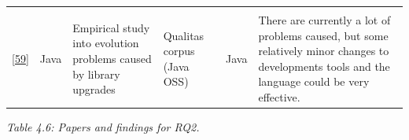 \documentclass[]{book}
\begin{document}
\begin{longtable}[]{@{}llllll@{}}
\begin{minipage}[t]{0.11\columnwidth}
\end{minipage}\tabularnewline
\begin{minipage}[t]{0.10\columnwidth}\raggedright\strut
{[}\protect\hyperlink{ref-Dietrich2014}{59}{]}\strut
\end{minipage} & \begin{minipage}[t]{0.18\columnwidth}\raggedright\strut
Java\strut
\end{minipage} & \begin{minipage}[t]{0.19\columnwidth}\raggedright\strut
Empirical study into evolution problems caused by library upgrades\strut
\end{minipage} & \begin{minipage}[t]{0.11\columnwidth}\raggedright\strut
Qualitas corpus (Java OSS)\strut
\end{minipage} & \begin{minipage}[t]{0.13\columnwidth}\raggedright\strut
Java\strut
\end{minipage} & \begin{minipage}[t]{0.11\columnwidth}\raggedright\strut
There are currently a lot of problems caused, but some relatively minor
changes to developments tools and the language could be very
effective.\strut
\end{minipage}\tabularnewline
\bottomrule
\end{longtable}

\emph{Table 4.6: Papers and findings for RQ2.}
\end{document}
